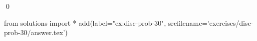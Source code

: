 
\begin{ex} 
  \label{ex:disc-prob-30}
  
  \qed
\end{ex} 
\begin{python0}
from solutions import *
add(label="ex:disc-prob-30",
    srcfilename='exercises/disc-prob-30/answer.tex') 
\end{python0}
